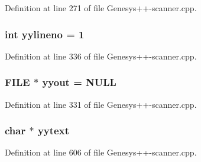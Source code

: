 Definition at line 271 of file Genesys++-\/scanner.\-cpp.

\hypertarget{_genesys_09_09-scanner_8cpp_a5e36364965360da7b7cdfc2188e0af84}{
\subsubsection[{yylineno}]{\setlength{\rightskip}{0pt plus 5cm}int yylineno = 1}}\label{_genesys_09_09-scanner_8cpp_a5e36364965360da7b7cdfc2188e0af84}


Definition at line 336 of file Genesys++-\/scanner.\-cpp.

\hypertarget{_genesys_09_09-scanner_8cpp_a296847b42b0baa62e2af36cb79f3c0eb}{
\subsubsection[{yyout}]{\setlength{\rightskip}{0pt plus 5cm}F\-I\-L\-E $\ast$ yyout = N\-U\-L\-L}}\label{_genesys_09_09-scanner_8cpp_a296847b42b0baa62e2af36cb79f3c0eb}


Definition at line 331 of file Genesys++-\/scanner.\-cpp.

\hypertarget{_genesys_09_09-scanner_8cpp_a35b96d819f6a8f8638894c429e68b02a}{
\subsubsection[{yytext}]{\setlength{\rightskip}{0pt plus 5cm}char $\ast$ yytext}}\label{_genesys_09_09-scanner_8cpp_a35b96d819f6a8f8638894c429e68b02a}


Definition at line 606 of file Genesys++-\/scanner.\-cpp.

